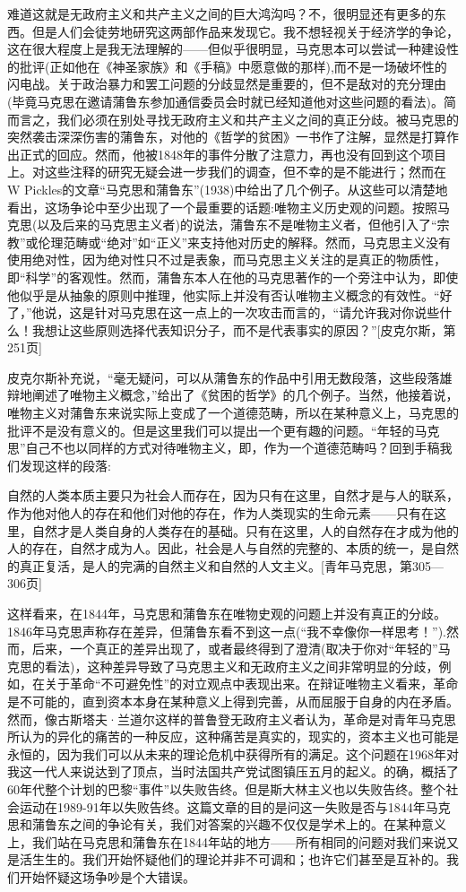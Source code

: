 \documentclass[DIV=12,%
               BCOR=0mm,%
               headinclude=false,%
               footinclude=false,open=any,%
               fontsize=10pt,%
               oneside,%
               paper=210mm:11in]%
               {scrbook}
\begin{document}
难道这就是无政府主义和共产主义之间的巨大鸿沟吗？不，很明显还有更多的东西。但是人们会徒劳地研究这两部作品来发现它。我不想轻视关于经济学的争论，这在很大程度上是我无法理解的——但似乎很明显，马克思本可以尝试一种建设性的批评(正如他在《神圣家族》和《手稿》中愿意做的那样),而不是一场破坏性的闪电战。关于政治暴力和罢工问题的分歧显然是重要的，但不是敌对的充分理由(毕竟马克思在邀请蒲鲁东参加通信委员会时就已经知道他对这些问题的看法)。简而言之，我们必须在别处寻找无政府主义和共产主义之间的真正分歧。被马克思的突然袭击深深伤害的蒲鲁东，对他的《哲学的贫困》一书作了注解，显然是打算作出正式的回应。然而，他被1848年的事件分散了注意力，再也没有回到这个项目上。对这些注释的研究无疑会进一步我们的调查，但不幸的是不能进行；然而在W Pickles的文章“马克思和蒲鲁东”(1938)中给出了几个例子。从这些可以清楚地看出，这场争论中至少出现了一个最重要的话题:唯物主义历史观的问题。按照马克思(以及后来的马克思主义者)的说法，蒲鲁东不是唯物主义者，但他引入了“宗教”或伦理范畴或“绝对”如“正义”来支持他对历史的解释。然而，马克思主义没有使用绝对性，因为绝对性只不过是表象，而马克思主义关注的是真正的物质性，即“科学”的客观性。然而，蒲鲁东本人在他的马克思著作的一个旁注中认为，即使他似乎是从抽象的原则中推理，他实际上并没有否认唯物主义概念的有效性。“好了，”他说，这是针对马克思在这一点上的一次攻击而言的，“请允许我对你说些什么！我想让这些原则选择代表知识分子，而不是代表事实的原因？”[皮克尔斯，第251页]


皮克尔斯补充说，“毫无疑问，可以从蒲鲁东的作品中引用无数段落，这些段落雄辩地阐述了唯物主义概念，”给出了《贫困的哲学》的几个例子。当然，他接着说，唯物主义对蒲鲁东来说实际上变成了一个道德范畴，所以在某种意义上，马克思的批评不是没有意义的。但是这里我们可以提出一个更有趣的问题。“年轻的马克思”自己不也以同样的方式对待唯物主义，即，作为一个道德范畴吗？回到手稿我们发现这样的段落:


自然的人类本质主要只为社会人而存在，因为只有在这里，自然才是与人的联系，作为他对他人的存在和他们对他的存在，作为人类现实的生命元素——只有在这里，自然才是人类自身的人类存在的基础。只有在这里，人的自然存在才成为他的人的存在，自然才成为人。因此，社会是人与自然的完整的、本质的统一，是自然的真正复活，是人的完满的自然主义和自然的人文主义。[青年马克思，第305—306页]


这样看来，在1844年，马克思和蒲鲁东在唯物史观的问题上并没有真正的分歧。1846年马克思声称存在差异，但蒲鲁东看不到这一点(“我不幸像你一样思考！”).然而，后来，一个真正的差异出现了，或者最终得到了澄清(取决于你对“年轻的”马克思的看法)，这种差异导致了马克思主义和无政府主义之间非常明显的分歧，例如，在关于革命“不可避免性”的对立观点中表现出来。在辩证唯物主义看来，革命是不可能的，直到资本本身在某种意义上得到完善，从而屈服于自身的内在矛盾。然而，像古斯塔夫·兰道尔这样的普鲁登无政府主义者认为，革命是对青年马克思所认为的异化的痛苦的一种反应，这种痛苦是真实的，现实的，资本主义也可能是永恒的，因为我们可以从未来的理论危机中获得所有的满足。这个问题在1968年对我这一代人来说达到了顶点，当时法国共产党试图镇压五月的起义。的确，概括了60年代整个计划的巴黎“事件”以失败告终。但是斯大林主义也以失败告终。整个社会运动在1989-91年以失败告终。这篇文章的目的是问这一失败是否与1844年马克思和蒲鲁东之间的争论有关，我们对答案的兴趣不仅仅是学术上的。在某种意义上，我们站在马克思和蒲鲁东在1844年站的地方——所有相同的问题对我们来说又是活生生的。我们开始怀疑他们的理论并非不可调和；也许它们甚至是互补的。我们开始怀疑这场争吵是个大错误。
\end{document}
